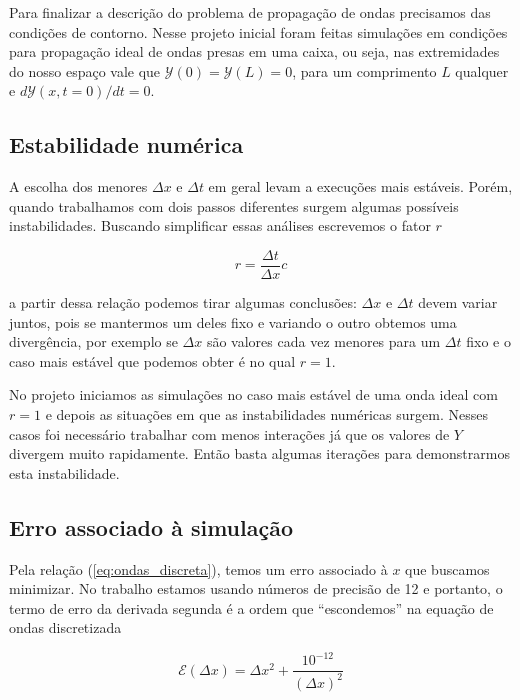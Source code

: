 \documentclass[a4paper, 11pt]{tufte-handout}
\begin{document}
Para finalizar a descrição do problema de propagação de ondas precisamos das condições de
contorno. Nesse projeto inicial foram feitas simulações em condições para propagação ideal de ondas
presas em uma caixa, ou seja, nas extremidades do nosso espaço vale que $\mathcal{Y}(0) = \mathcal{Y}(L) = 0$, para um
comprimento $L$ qualquer e $d \mathcal{Y}(x, t = 0)/ dt = 0$. 

\subsection{Estabilidade numérica}
\label{sec:estabilidade}
A escolha dos menores \( \Delta x \) e \( \Delta t \) em geral levam a execuções mais estáveis. Porém, quando
trabalhamos com dois passos diferentes surgem algumas possíveis instabilidades. Buscando simplificar
essas análises escrevemos o fator $r$

\begin{equation}
  r = \frac{\Delta t}{\Delta x} c
  \label{eq:fator_r}
\end{equation}

a partir dessa relação podemos tirar algumas conclusões: \( \Delta x \) e \( \Delta t \) devem variar juntos,
pois se mantermos um deles fixo e variando o outro obtemos uma divergência, por exemplo se \( \Delta x \)
são valores cada vez menores para um \( \Delta t \) fixo e o caso mais estável que podemos obter é no
qual \( r = 1  \).

No projeto iniciamos as simulações no caso mais estável de uma onda ideal com \( r = 1 \) e depois
as situações em que as instabilidades numéricas surgem. Nesses casos foi necessário trabalhar com
menos interações já que os valores de $Y$ divergem muito rapidamente. Então basta algumas iterações
para demonstrarmos esta instabilidade.


\subsection{Erro associado à simulação}
\label{sec:erro}

Pela relação (\ref{eq:ondas_discreta}), temos um erro associado à \( x \) que buscamos
minimizar. No trabalho estamos usando números de precisão de 12 e portanto, o termo de
erro da derivada segunda é a ordem que ``escondemos'' na equação de ondas discretizada

\begin{equation}
  \mathcal{E}(\Delta x) =  \Delta x^2 + \frac{10^{-12}}{(\Delta x)^2}
\end{equation}
\end{document}
